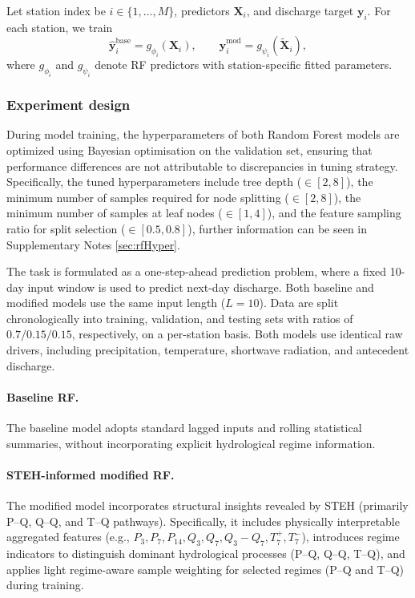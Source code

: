 \documentclass[11pt]{article}
\begin{document}
Let station index be $i\in\{1,\dots,M\}$, predictors $\mathbf{X}_i$, and discharge target $\mathbf{y}_i$. For each station, we train
\begin{equation}
    \hat{\mathbf{y}}^{\text{base}}_i = g_{\phi_i}(\mathbf{X}_i),
    \qquad
    \hat{\mathbf{y}}^{\text{mod}}_i = g_{\psi_i}(\widetilde{\mathbf{X}}_i),
\end{equation}
where $g_{\phi_i}$ and $g_{\psi_i}$ denote RF predictors with station-specific fitted parameters.

\subsubsection*{Experiment design}

During model training, the hyperparameters of both Random Forest models are optimized using Bayesian optimisation on the validation set\cite{BO_OPT}, ensuring that performance differences are not attributable to discrepancies in tuning strategy. Specifically, the tuned hyperparameters include tree depth ($\in [2, 8]$), the minimum number of samples required for node splitting ($\in [2, 8]$), the minimum number of samples at leaf nodes ($\in [1, 4]$), and the feature sampling ratio for split selection ($\in [0.5, 0.8]$), further information can be seen in Supplementary Notes \ref{sec:rfHyper}.

The task is formulated as a one-step-ahead prediction problem, where a fixed 10-day input window is used to predict next-day discharge. Both baseline and modified models use the same input length ($L=10$). Data are split chronologically into training, validation, and testing sets with ratios of $0.7/0.15/0.15$, respectively, on a per-station basis. Both models use identical raw drivers, including precipitation, temperature, shortwave radiation, and antecedent discharge.

\paragraph{Baseline RF.}
The baseline model adopts standard lagged inputs and rolling statistical summaries, without incorporating explicit hydrological regime information.

\paragraph{STEH-informed modified RF.}
The modified model incorporates structural insights revealed by STEH (primarily P--Q, Q--Q, and T--Q pathways). Specifically, it includes physically interpretable aggregated features (e.g., $P_{3}, P_{7}, P_{14}, Q_{3}, Q_{7}, Q_{3}-Q_{7}, T_{7}^{+}, T_{7}^{-}$), introduces regime indicators to distinguish dominant hydrological processes (P--Q, Q--Q, T--Q), and applies light regime-aware sample weighting for selected regimes (P--Q and T--Q) during training.
\end{document}
